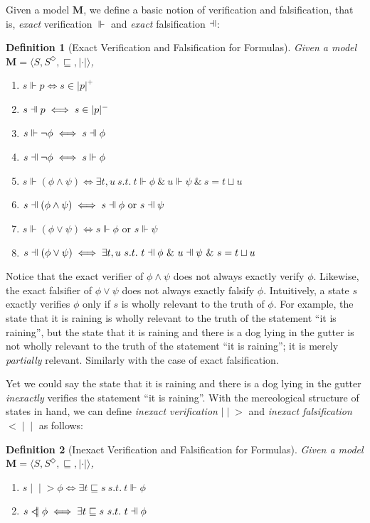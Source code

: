 \documentclass[12pt]{article}
\newtheorem{definition}{Definition}[section]
\newcommand{\fal}{\mathrel{\text{\reflectbox{$\Vdash$}}}}
\newcommand{\ver}{\Vdash}
\newcommand{\inever}{\mid \! \mid \!\!>}
\newcommand{\inefal}{< \! \! \mid \! \mid}
\begin{document}
\par
Given a model $\bm{M}$, we define a basic notion of verification and falsification, that is, \textit{exact} verification $\ver$ and \textit{exact} falsification $\fal$: 
\begin{definition}[Exact Verification and Falsification for Formulas]
Given a model $\bm{M} = \langle S, S^\Diamond, \sqsubseteq, | \cdot  | \rangle$, 
    \begin{enumerate}[align=left]
    \item[$(atom)^+$] $s \ver p \iff s \in |p|^+$ 
    \item[$(atom)^-$] $s \fal p \iff s \in |p|^-$ 
    \item[$(negation)^+$] $s \ver \lnot \phi \iff s \fal \phi$ 
    \item[$(negation)^-$] $s \fal \lnot \phi \iff s \ver \phi$
    \item[$(conjunction)^+$] $s \ver (\phi \land \psi) \iff \exists t, u \ s.t. \ t \ver \phi \ \& \ u \ver \psi \ \& \ s = t \sqcup u$
    \item[$(conjunction)^-$] $s \fal (\phi \land \psi) \iff s \fal \phi \text{ or } s \fal \psi$
    \item[$(disjunction)^+$] $s \ver (\phi \lor \psi) \iff s \ver \phi \text{ or } s \ver \psi$ 
    \item[$(disjunction)^-$] $s \fal (\phi \lor \psi) \iff \exists t, u \ s.t. \ t \fal \phi \ \& \ u \fal \psi \ \& \ s = t \sqcup u$
    \end{enumerate}
\end{definition}
Notice that the exact verifier of $\phi \land \psi$ does not always exactly verify $\phi$. Likewise, the exact falsifier of $\phi \lor \psi$ does not always exactly falsify $\phi$. Intuitively, a state $s$ exactly verifies $\phi$ only if $s$ is wholly relevant to the truth of $\phi$. For example, the state that it is raining is wholly relevant to the truth of the statement ``it is raining'', but the state that it is raining and there is a dog lying in the gutter is not wholly relevant to the truth of the statement ``it is raining''; it is merely \textit{partially} relevant. Similarly with the case of exact falsification. 
\par
Yet we could say the state that it is raining and there is a dog lying in the gutter \textit{inexactly} verifies the statement ``it is raining''. With the mereological structure of states in hand, we can define \textit{inexact verification} $\inever$ and \textit{inexact falsification} $\inefal$ as follows: 
\begin{definition}[Inexact Verification and Falsification for Formulas] Given a model $\bm{M} = \langle S, S^\Diamond, \sqsubseteq, | \cdot  | \rangle$, 
    \begin{enumerate}[align=left]
    \item[$(inexact)^+$] $s \inever \phi \iff \exists t \sqsubseteq s \ s. t. \ t \ver \phi$ 
    \item[$(inexact)^-$] $s \inefal \phi \iff \exists t \sqsubseteq s \ s. t. \ t \fal \phi$ 
    \end{enumerate}
\end{definition}
\end{document}
